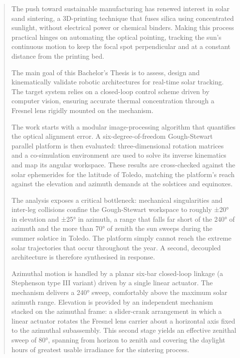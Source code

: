\begin{abstract}
The push toward sustainable manufacturing has renewed interest in solar sand sintering, a 3D-printing technique that fuses silica using concentrated sunlight, without electrical power or chemical binders. Making this process practical hinges on automating the optical pointing, tracking the sun's continuous motion to keep the focal spot perpendicular and at a constant distance from the printing bed.

The main goal of this Bachelor's Thesis is to assess, design and kinematically validate robotic architectures for real-time solar tracking. The target system relies on a closed-loop control scheme driven by computer vision, ensuring accurate thermal concentration through a Fresnel lens rigidly mounted on the mechanism.

The work starts with a modular image-processing algorithm that quantifies the optical alignment error. A six-degree-of-freedom Gough-Stewart parallel platform is then evaluated: three-dimensional rotation matrices and a co-simulation environment are used to solve its inverse kinematics and map its angular workspace. These results are cross-checked against the solar ephemerides for the latitude of Toledo, matching the platform's reach against the elevation and azimuth demands at the solstices and equinoxes.

The analysis exposes a critical bottleneck: mechanical singularities and inter-leg collisions confine the Gough-Stewart workspace to roughly ±20° in elevation and ±25° in azimuth, a range that falls far short of the 240° of azimuth and the more than 70° of zenith the sun sweeps during the summer solstice in Toledo. The platform simply cannot reach the extreme solar trajectories that occur throughout the year. A second, decoupled architecture is therefore synthesised in response.

Azimuthal motion is handled by a planar six-bar closed-loop linkage (a Stephenson type III variant) driven by a single linear actuator. The mechanism delivers a 240° sweep, comfortably above the maximum solar azimuth range. Elevation is provided by an independent mechanism stacked on the azimuthal frame: a slider-crank arrangement in which a linear actuator rotates the Fresnel lens carrier about a horizontal axis fixed to the azimuthal subassembly. This second stage yields an effective zenithal sweep of 80°, spanning from horizon to zenith and covering the daylight hours of greatest usable irradiance for the sintering process.


\end{abstract}
